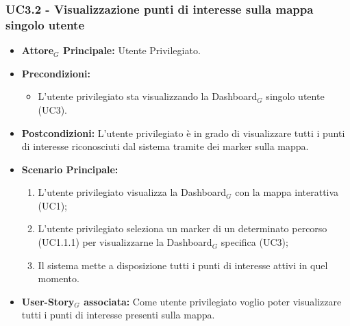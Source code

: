 \documentclass[11pt]{article}
\begin{document}
\begin{justify}
\subsubsection{\textbf{UC3.2 - Visualizzazione punti di interesse sulla mappa singolo utente}}
\label{UC3.2}
\begin{itemize}
     \item \textbf{Attore$_G$ Principale:} Utente Privilegiato.
     \item \textbf{Precondizioni:}
        \begin{itemize}
    		\item L'utente privilegiato sta visualizzando la Dashboard$_G$ singolo utente (UC3).
        \end{itemize}
     \item \textbf{Postcondizioni:} L'utente privilegiato è in grado di visualizzare tutti i punti di interesse riconosciuti dal sistema tramite dei marker sulla mappa.
     \item \textbf{Scenario Principale:}
        \begin{enumerate}
            \item L'utente privilegiato visualizza la Dashboard$_G$ con la mappa interattiva (UC1);
            \item L'utente privilegiato seleziona un marker di un determinato percorso (UC1.1.1) per visualizzarne la Dashboard$_G$ specifica (UC3);
            \item Il sistema mette a disposizione tutti i punti di interesse attivi in quel momento.
        \end{enumerate}
     \item \textbf{User-Story$_G$ associata:}
     Come utente privilegiato voglio poter visualizzare tutti i punti di interesse presenti sulla mappa.
\end{itemize}

\end{justify}
\end{document}
